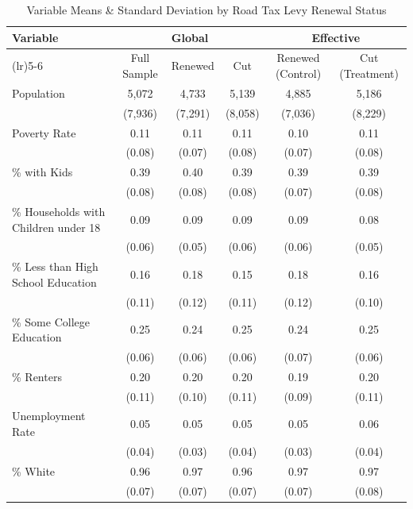 \begin{table}[H]
    \centering
    \caption{Variable Means \& Standard Deviation by Road Tax Levy Renewal Status}
    \label{tab:variable_means_sd}
    \begingroup
    \footnotesize
    \setlength{\tabcolsep}{3pt}
    \begin{tabular}{>{\raggedright\arraybackslash}p{3.4cm}ccccc}
    \hline
    Variable & \multicolumn{3}{c}{Global} & \multicolumn{2}{c}{Effective} \\
    \cmidrule(lr){2-4} \cmidrule(lr){5-6}
    & Full Sample & Renewed & Cut & Renewed (Control) & Cut (Treatment) \\
    \hline
    Population & 5,072 & 4,733 & 5,139 & 4,885 & 5,186 \\
                & (7,936) & (7,291) & (8,058) & (7,036) & (8,229) \\
    Poverty Rate & 0.11 & 0.11 & 0.11 & 0.10 & 0.11 \\
                    & (0.08) & (0.07) & (0.08) & (0.07) & (0.08) \\
    \% with Kids & 0.39 & 0.40 & 0.39 & 0.39 & 0.39 \\
                    & (0.08) & (0.08) & (0.08) & (0.07) & (0.08) \\
    \% Households with Children under 18 & 0.09 & 0.09 & 0.09 & 0.09 & 0.08 \\
                                            & (0.06) & (0.05) & (0.06) & (0.06) & (0.05) \\
    \% Less than High School Education & 0.16 & 0.18 & 0.15 & 0.18 & 0.16 \\
                                        & (0.11) & (0.12) & (0.11) & (0.12) & (0.10) \\
    \% Some College Education & 0.25 & 0.24 & 0.25 & 0.24 & 0.25 \\
                                & (0.06) & (0.06) & (0.06) & (0.07) & (0.06) \\
    \% Renters & 0.20 & 0.20 & 0.20 & 0.19 & 0.20 \\
                & (0.11) & (0.10) & (0.11) & (0.09) & (0.11) \\
    Unemployment Rate & 0.05 & 0.05 & 0.05 & 0.05 & 0.06 \\
                            & (0.04) & (0.03) & (0.04) & (0.03) & (0.04) \\
    \% White & 0.96 & 0.97 & 0.96 & 0.97 & 0.97 \\
                & (0.07) & (0.07) & (0.07) & (0.07) & (0.08) \\

\end{tabular}
\end{table}
